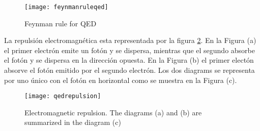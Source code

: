 \begin{figure}
  \texttt{[image: feynmanruleqed]} %
  \caption{Feynman rule for QED}
  \label{fig:feynmanruleqed}
\end{figure}

La repulsión electromagnética esta representada por la figura \ref{fig:qedrepulsion}. En la Figura (a) el primer electrón emite un fotón y se dispersa, mientras que el segundo absorbe el fotón y se dispersa en la dirección opuesta. En la Figura (b) el primer electón absorve el fotón emitido por el segundo electrón. Los dos diagrams se representa por uno único con el fotón en horizontal como se muestra en la Figura (c).

\begin{figure}
  \centering
  \texttt{[image: qedrepulsion]}
  \caption{Electromagnetic repulsion. The diagrams (a) and (b) are summarized in the diagram (c)}
  \label{fig:qedrepulsion}
\end{figure}





